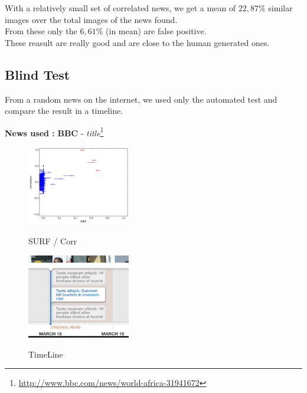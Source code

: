 \documentclass[10pt, journal,twocolumn]{IEEEtran}
\begin{document}
With a relatively small set of correlated news, we get a mean of $22,87\%$ similar images over the total images of the news found.\\
From these only the $6,61\%$ (in mean) are false positive.\\[0.5cm]

These reasult are really good and are close to the human generated ones.

\subsection{Blind Test}

From a random news on the internet, we used only the automated test and compare the result in a timeline.

\begin{center}
\textbf{News used :} \textbf{BBC} - \emph{title}\footnote{\url{http://www.bbc.com/news/world-africa-31941672}}
\end{center}

\begin{figure}[!ht]
  \begin{center}
  \includegraphics[keepaspectratio,width=0.4\textwidth]{6}\\
  \caption{SURF / Corr}
  \end{center}
\end{figure}

\begin{figure}[!ht]
  \begin{center}
  \includegraphics[keepaspectratio,width=0.4\textwidth]{6tl}\\
  \caption{TimeLine}
  \end{center}
\end{figure}
\end{document}
